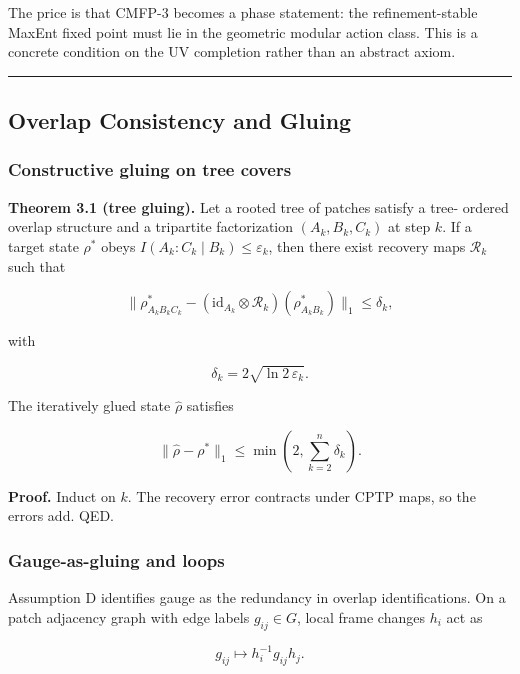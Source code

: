 \documentclass[11pt,a4paper]{article}
\theoremstyle{remark}
\begin{document}
The price is that CMFP-3 becomes a phase statement: the refinement-stable MaxEnt
fixed point must lie in the geometric modular action class. This is a concrete
condition on the UV completion rather than an abstract axiom.

\begin{center}\rule{0.5\linewidth}{0.5pt}\end{center}

\subsection{Overlap Consistency and Gluing}\label{overlap-consistency-and-gluing}

\subsubsection{Constructive gluing on tree covers}\label{constructive-gluing-on-tree-covers}

\textbf{Theorem 3.1 (tree gluing).} Let a rooted tree of patches satisfy a tree-
ordered overlap structure and a tripartite factorization \((A_k, B_k, C_k)\) at
step \(k\). If a target state \(\rho^{\ast}\) obeys \(I(A_k:C_k \mid B_k) \le \varepsilon_k\), then there exist
recovery maps \(\mathcal{R}_k\) such that

\[
\| \rho^{\ast}_{A_k B_k C_k} - (\mathrm{id}_{A_k} \otimes \mathcal{R}_k)(\rho^{\ast}_{A_k B_k}) \|_1
\le \delta_k,
\]

with

\[
\delta_k = 2 \sqrt{\ln 2\, \varepsilon_k}.
\]

The iteratively glued state \(\hat{\rho}\) satisfies

\[
\| \hat{\rho} - \rho^{\ast} \|_1 \le \min\left(2, \sum_{k=2}^n \delta_k\right).
\]

\textbf{Proof.} Induct on \(k\). The recovery error contracts under CPTP maps, so the
errors add. QED.

\subsubsection{Gauge-as-gluing and loops}\label{gauge-as-gluing-and-loops}

Assumption D identifies gauge as the redundancy in overlap identifications.
On a patch adjacency graph with edge labels \(g_{ij} \in G\), local frame changes
\(h_i\) act as

\[
 g_{ij} \mapsto h_i^{-1} g_{ij} h_j.
\]
\end{document}
